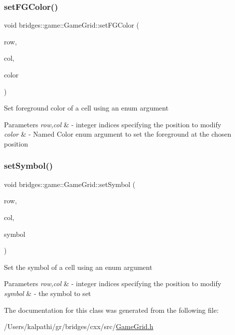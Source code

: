 \subsubsection{\texorpdfstring{setFGColor()}{setFGColor()}}
{\footnotesize\ttfamily void bridges\+::game\+::\+Game\+Grid\+::set\+F\+G\+Color (\begin{DoxyParamCaption}\item[{int}]{row,  }\item[{int}]{col,  }\item[{\mbox{\hyperlink{namespacebridges_1_1game_afaa832a4322b25b6a4ebfba832f10f26}{Named\+Color}}}]{color }\end{DoxyParamCaption})\hspace{0.3cm}{\ttfamily [inline]}}

Set foreground color of a cell using an enum argument


\begin{DoxyParams}{Parameters}
{\em row,col} & -\/ integer indices specifying the position to modify \\
\hline
{\em color} & -\/ Named Color enum argument to set the foreground at the chosen position \\
\hline
\end{DoxyParams}
\mbox{\label{classbridges_1_1game_1_1_game_grid_aaca03d00599251edb5312e9ba51dd62e}} 
\subsubsection{\texorpdfstring{setSymbol()}{setSymbol()}}
{\footnotesize\ttfamily void bridges\+::game\+::\+Game\+Grid\+::set\+Symbol (\begin{DoxyParamCaption}\item[{int}]{row,  }\item[{int}]{col,  }\item[{\mbox{\hyperlink{namespacebridges_1_1game_ab9a19c7ab6e2ebac2f95180e21733487}{Named\+Symbol}}}]{symbol }\end{DoxyParamCaption})\hspace{0.3cm}{\ttfamily [inline]}}

Set the symbol of a cell using an enum argument


\begin{DoxyParams}{Parameters}
{\em row,col} & -\/ integer indices specifying the position to modify \\
\hline
{\em symbol} & -\/ the symbol to set \\
\hline
\end{DoxyParams}


The documentation for this class was generated from the following file\+:\begin{DoxyCompactItemize}
\item 
/\+Users/kalpathi/gr/bridges/cxx/src/\mbox{\hyperlink{_game_grid_8h}{Game\+Grid.\+h}}\end{DoxyCompactItemize}
